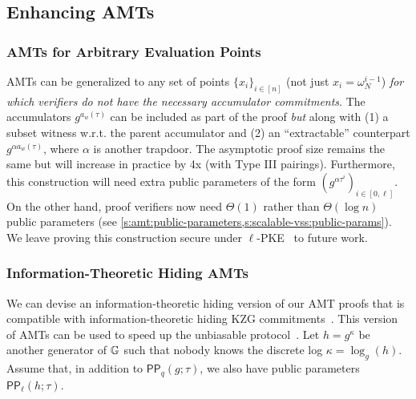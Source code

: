 \subsection{Enhancing AMTs}

\subsubsection{AMTs for Arbitrary Evaluation Points}
\label{s:amt:arbitrary-points}
AMTs can be generalized to any set of points $\{x_i\}_{i\in[n]}$ (not just $x_i=\omega_N^{i-1}$) \textit{for which verifiers do not have the necessary accumulator commitments}.
The accumulators $g^{a_{w}(\tau)}$ can be included as part of the proof \textit{but} along with (1) a subset witness w.r.t. the parent accumulator and (2) an ``extractable'' counterpart $g^{\alpha a_w(\tau)}$, where $\alpha$ is another trapdoor.
The asymptotic proof size remains the same but will increase in practice by 4x (with Type III pairings).
Furthermore, this construction will need extra public parameters of the form $(g^{\alpha \tau^i})_{i\in[0,\ell]}$.
On the other hand, proof verifiers now need $\Theta(1)$ rather than $\Theta(\log{n})$ public parameters (see \cref{s:amt:public-parameters,s:scalable-vss:public-params}).
We leave proving this construction secure under $\ell$-PKE~\cite{groth10} to future work.


\subsubsection{Information-Theoretic Hiding AMTs}
\label{s:amt:information-theoretic-amts}
We can devise an information-theoretic hiding version of our AMT proofs that is compatible with information-theoretic hiding KZG commitments~\cite{KZG10a}.
This version of AMTs can be used to speed up the unbiasable \newdkg protocol~\cite{GJKR07}. 
Let $h=g^{\kappa}$ be another generator of $\mathbb{G}$ such that nobody knows the discrete log $\kappa=\log_g(h)$.
Assume that, in addition to $\mathsf{PP}_q(g; \tau)$, we also have public parameters $\mathsf{PP}_\ell(h;\tau)$.


